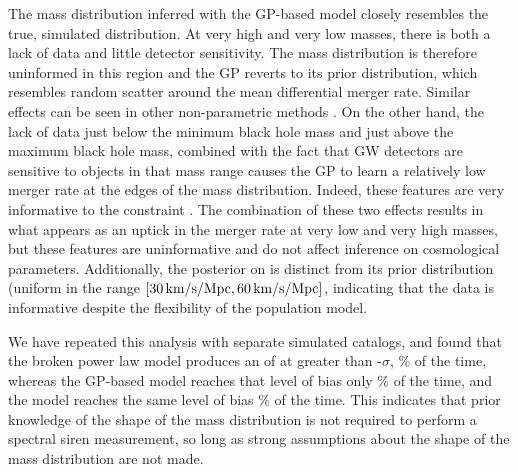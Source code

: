 \documentclass[]{aastex631}
\begin{document}
The mass distribution inferred with the \ac{GP}-based model closely resembles the true, simulated distribution.%
At very high and very low masses, there is both a lack of data and little detector sensitivity.
The mass distribution is therefore uninformed in this region and the \ac{GP} reverts to its prior distribution, which resembles random scatter around the mean differential merger rate.
Similar effects can be seen in other non-parametric methods \citep{edelman_cover_2023, callister_parameter-free_2023}.
On the other hand, the lack of data just below the minimum black hole mass and just above the maximum black hole mass, combined with the fact that \ac{GW} detectors are sensitive to objects in that mass range causes the \ac{GP} to learn a relatively low merger rate at the edges of the mass distribution.
Indeed, these features are very informative to the \Ho{} constraint \citep{the_ligo_scientific_collaboration_constraints_2021}.
The combination of these two effects results in what appears as an uptick in the merger rate at very low and very high masses, but these features are uninformative and do not affect inference on cosmological parameters.
Additionally, the posterior on \Ho{} is distinct from its prior distribution (uniform in the range $[30\,\text{km/s/Mpc},60\,\text{km/s/Mpc}]$, indicating that the data is informative despite the flexibility of the population model.

We have repeated this analysis with  separate simulated catalogs, and found that the broken power law model produces an  of \Ho{} at greater than -$\sigma$, \% of the time, whereas the \ac{GP}-based model reaches that level of bias only \% of the time, and the \plp{} model reaches the same level of bias \% of the time.
This indicates that prior knowledge of the shape of the mass distribution is not required to perform a spectral siren measurement, so long as strong assumptions about the shape of the mass distribution are not made.
\end{document}
